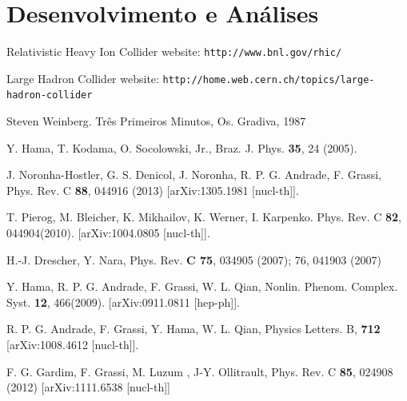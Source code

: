 \documentclass[a4paper,12pt]{article}
\begin{document}
\section{Desenvolvimento e Análises}



\begin{thebibliography}{99}

Relativistic Heavy Ion Collider website: \verb#http://www.bnl.gov/rhic/#

Large Hadron Collider website: \verb#http://home.web.cern.ch/topics/large-hadron-collider#

Steven Weinberg. Três Primeiros Minutos, Os. Gradiva, 1987

Y. Hama, T. Kodama, O. Socolowski, Jr., Braz. J. Phys. \textbf{35}, 24 (2005).

J. Noronha-Hostler, G. S. Denicol, J. Noronha, R. P. G. Andrade, F. Grassi, Phys. Rev. C \textbf{88}, 044916 (2013) [arXiv:1305.1981 [nucl-th]].




T. Pierog, M. Bleicher, K. Mikhailov, K. Werner, I. Karpenko. Phys. Rev. C \textbf{82}, 044904(2010). [arXiv:1004.0805 [nucl-th]].

H.-J. Drescher, Y. Nara, Phys. Rev. \textbf{C 75}, 034905 (2007); 76, 041903 (2007)

Y. Hama, R. P. G. Andrade, F. Grassi, W. L. Qian, Nonlin. Phenom. Complex. Syst. \textbf{12}, 466(2009). [arXiv:0911.0811 [hep-ph]].

R. P. G. Andrade, F. Grassi, Y. Hama, W. L. Qian, Physics Letters. B, \textbf{712} [arXiv:1008.4612 [nucl-th]].

F. G. Gardim, F. Grassi, M. Luzum , J-Y. Ollitrault, Phys. Rev. C \textbf{85}, 024908 (2012) [arXiv:1111.6538 [nucl-th]]




\end{thebibliography}
\end{document}
